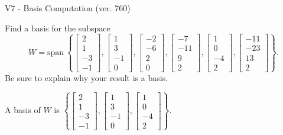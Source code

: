 \begin{exercise}
  \begin{exerciseTitle}V7 - Basis Computation (ver. 760)\end{exerciseTitle}
  \begin{exerciseStatement}
    Find a basis for the subspace 
\[W=\mathrm{span}\ \left\{\left[\begin{array}{r}
2 \\
1 \\
-3 \\
-1
\end{array}\right] , \left[\begin{array}{r}
1 \\
3 \\
-1 \\
0
\end{array}\right] , \left[\begin{array}{r}
-2 \\
-6 \\
2 \\
0
\end{array}\right] , \left[\begin{array}{r}
-7 \\
-11 \\
9 \\
2
\end{array}\right] , \left[\begin{array}{r}
1 \\
0 \\
-4 \\
2
\end{array}\right] , \left[\begin{array}{r}
-11 \\
-23 \\
13 \\
2
\end{array}\right]\right\}.\]
 Be sure to explain why your result is a basis.


  \end{exerciseStatement}
  \begin{exerciseAnswer}
   A basis of \(W\) is  \(\left\{\left[\begin{array}{r}
2 \\
1 \\
-3 \\
-1
\end{array}\right] , \left[\begin{array}{r}
1 \\
3 \\
-1 \\
0
\end{array}\right] , \left[\begin{array}{r}
1 \\
0 \\
-4 \\
2
\end{array}\right]\right\}\).
  


  \end{exerciseAnswer}
\end{exercise}